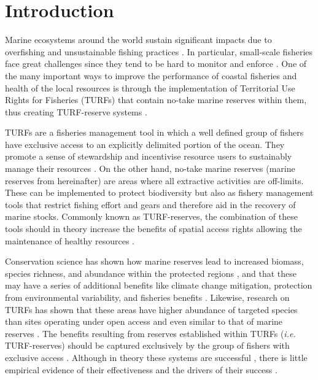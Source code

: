 \documentclass{frontiersSCNS}
\begin{document}
\hypertarget{introduction}{%
\section{Introduction}\label{introduction}}

Marine ecosystems around the world sustain significant impacts due to
overfishing and unsustainable fishing practices
\citep{halpern_2008-dK,worm_2006-IB,pauly_2005-qV}. In particular,
small-scale fisheries face great challenges since they tend to be hard
to monitor and enforce \citep{costello_2012}. One of the many important
ways to improve the performance of coastal fisheries and health of the
local resources is through the implementation of Territorial Use Rights
for Fisheries (TURFs) that contain no-take marine reserves within them,
thus creating TURF-reserve systems
\citep{afflerbach_2014,gelcich_2015,lester_2017}.

TURFs are a fisheries management tool in which a well defined group of
fishers have exclusive access to an explicitly delimited portion of the
ocean. They promote a sense of stewardship and incentivise resource
users to sustainably manage their resources
\citep{gelcich_2008,costello_2010,mccay_2014}. On the other hand,
no-take marine reserves (marine reserves from hereinafter) are areas
where all extractive activities are off-limits. These can be implemented
to protect biodiversity but also as fishery management tools that
restrict fishing effort and gears and therefore aid in the recovery of
marine stocks. Commonly known as TURF-reserves, the combination of these
tools should in theory increase the benefits of spatial access rights
allowing the maintenance of healthy resources
\citep{afflerbach_2014,gelcich_2015,lester_2017}.

Conservation science has shown how marine reserves lead to increased
biomass, species richness, and abundance within the protected regions
\citep{lester_2009}, and that these may have a series of additional
benefits like climate change mitigation, protection from environmental
variability, and fisheries benefits
\cite{roberts_2017-J9,micheli_2012-EU,krueck_2017-J1}. Likewise,
research on TURFs has shown that these areas have higher abundance of
targeted species than sites operating under open access and even similar
to that of marine reserves \citep{gelcich_2008,gelcich_2012}. The
benefits resulting from reserves established within TURFs (\emph{i.e.}
TURF-reserves) should be captured exclusively by the group of fishers
with exclusive access \citep{gelcich_2015}. Although in theory these
systems are successful \citep{gelcich_2015,smallhornwest_2018}, there is
little empirical evidence of their effectiveness and the drivers of
their success \citep{afflerbach_2014,lester_2017}.
\end{document}
